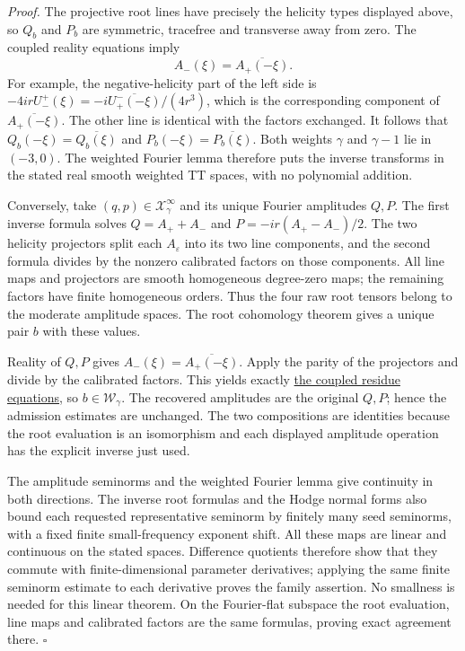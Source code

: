 \documentclass[
  english,
  11pt,
  reqno]{amsart}
\begin{document}
\emph{Proof.} The projective root lines have precisely the helicity
types displayed above, so \(Q_b\) and \(P_b\) are symmetric, tracefree
and transverse away from zero. The coupled reality equations imply \[
A_-(\xi)=\overline{A_+(-\xi)}.
\] For example, the negative-helicity part of the left side is
\(-4irU^+_-(\xi)=-i\overline{U^-_+(-\xi)}/(4r^3)\), which is the
corresponding component of \(\overline{A_+(-\xi)}\). The other line is
identical with the factors exchanged. It follows that
\(Q_b(-\xi)=\overline{Q_b(\xi)}\) and \(P_b(-\xi)=\overline{P_b(\xi)}\).
Both weights \(\gamma\) and \(\gamma-1\) lie in \((-3,0)\). The weighted
Fourier lemma therefore puts the inverse transforms in the stated real
smooth weighted TT spaces, with no polynomial addition.

Conversely, take \((q,p)\in\mathcal X^\infty_\gamma\) and its unique
Fourier amplitudes \(Q,P\). The first inverse formula solves
\(Q=A_++A_-\) and \(P=-ir(A_+-A_-)/2\). The two helicity projectors
split each \(A_\varepsilon\) into its two line components, and the
second formula divides by the nonzero calibrated factors on those
components. All line maps and projectors are smooth homogeneous
degree-zero maps; the remaining factors have finite homogeneous orders.
Thus the four raw root tensors belong to the moderate amplitude spaces.
The root cohomology theorem gives a unique pair \(b\) with these values.

Reality of \(Q,P\) gives \(A_-(\xi)=\overline{A_+(-\xi)}\). Apply the
parity of the projectors and divide by the calibrated factors. This
yields exactly \hyperref[eq:online-root-residue-reality]{the coupled
residue equations}, so \(b\in\mathscr W_\gamma\). The recovered
amplitudes are the original \(Q,P\); hence the admission estimates are
unchanged. The two compositions are identities because the root
evaluation is an isomorphism and each displayed amplitude operation has
the explicit inverse just used.

The amplitude seminorms and the weighted Fourier lemma give continuity
in both directions. The inverse root formulas and the Hodge normal forms
also bound each requested representative seminorm by finitely many seed
seminorms, with a fixed finite small-frequency exponent shift. All these
maps are linear and continuous on the stated spaces. Difference
quotients therefore show that they commute with finite-dimensional
parameter derivatives; applying the same finite seminorm estimate to
each derivative proves the family assertion. No smallness is needed for
this linear theorem. On the Fourier-flat subspace the root evaluation,
line maps and calibrated factors are the same formulas, proving exact
agreement there. \hfill\(\square\)
\end{document}
